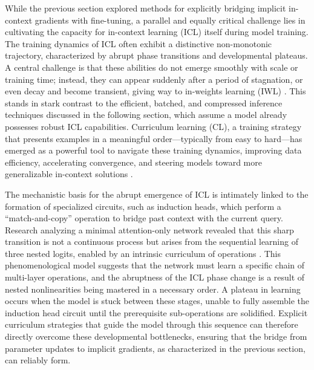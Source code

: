 \documentclass[11pt]{article}
\begin{document}
While the previous section explored methods for explicitly bridging implicit in-context gradients with fine-tuning, a parallel and equally critical challenge lies in cultivating the capacity for in-context learning (ICL) itself during model training. The training dynamics of ICL often exhibit a distinctive non-monotonic trajectory, characterized by abrupt phase transitions and developmental plateaus. A central challenge is that these abilities do not emerge smoothly with scale or training time; instead, they can appear suddenly after a period of stagnation, or even decay and become transient, giving way to in-weights learning (IWL) \cite{ref55}. This stands in stark contrast to the efficient, batched, and compressed inference techniques discussed in the following section, which assume a model already possesses robust ICL capabilities. Curriculum learning (CL), a training strategy that presents examples in a meaningful order---typically from easy to hard---has emerged as a powerful tool to navigate these training dynamics, improving data efficiency, accelerating convergence, and steering models toward more generalizable in-context solutions \cite{ref199,ref200}.

The mechanistic basis for the abrupt emergence of ICL is intimately linked to the formation of specialized circuits, such as induction heads, which perform a ``match-and-copy'' operation to bridge past context with the current query. Research analyzing a minimal attention-only network revealed that this sharp transition is not a continuous process but arises from the sequential learning of three nested logits, enabled by an intrinsic curriculum of operations \cite{ref55}. This phenomenological model suggests that the network must learn a specific chain of multi-layer operations, and the abruptness of the ICL phase change is a result of nested nonlinearities being mastered in a necessary order. A plateau in learning occurs when the model is stuck between these stages, unable to fully assemble the induction head circuit until the prerequisite sub-operations are solidified. Explicit curriculum strategies that guide the model through this sequence can therefore directly overcome these developmental bottlenecks, ensuring that the bridge from parameter updates to implicit gradients, as characterized in the previous section, can reliably form.
\end{document}
